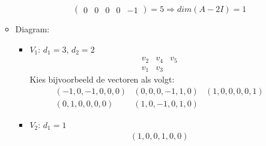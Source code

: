 \documentclass[main.tex]{subfiles}
\begin{document}
\begin{itemize}
\begin{itemize}
\begin{itemize}
\[\begin{pmatrix}
        0 & 0 & 0 & 0 & -1
      \end{pmatrix}
      =5 \Rightarrow dim(A-2I) = 1
      \]
    \end{itemize}
  \item Diagram:
    \begin{itemize}
    \item $V_{1}$: $d_{1} = 3$, $d_{2} = 2$
      \[
      \begin{array}{ccc}
        \boxed{v_{2}} & \boxed{v_{4}} & \boxed{v_{5}}\\
        \boxed{v_{1}} & \boxed{v_{3}}
      \end{array}
      \]
      Kies bijvoorbeeld de vectoren als volgt:
      \[
      \begin{array}{ccc}
        \boxed{(-1,0,-1,0,0,0)} & \boxed{(0,0,0,-1,1,0)} & \boxed{(1,0,0,0,0,1)}\\
        \boxed{(0,1,0,0,0,0)} & \boxed{(1,0,-1,0,1,0)}
      \end{array}
      \]
    \item $V_{2}$: $d_{1}=1$
      \[
      \begin{array}{ccc}
        \boxed{(1,0,0,1,0,0)}
      \end{array}
      \]


\end{itemize}
\end{itemize}
\end{itemize}
\end{document}
